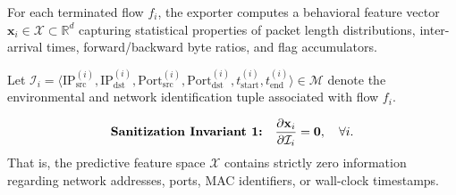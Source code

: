 \documentclass[conference]{IEEEtran}
\begin{document}
For each terminated flow $f_i$, the exporter computes a behavioral feature vector $\mathbf{x}_i \in \mathcal{X} \subset \mathbb{R}^d$ capturing statistical properties of packet length distributions, inter-arrival times, forward/backward byte ratios, and flag accumulators. 

Let $\mathcal{I}_i = \langle \text{IP}_{\text{src}}^{(i)}, \text{IP}_{\text{dst}}^{(i)}, \text{Port}_{\text{src}}^{(i)}, \text{Port}_{\text{dst}}^{(i)}, t_{\text{start}}^{(i)}, t_{\text{end}}^{(i)} \rangle \in \mathcal{M}$ denote the environmental and network identification tuple associated with flow $f_i$. 

\begin{equation}
\text{\textbf{Sanitization Invariant 1:}} \quad \frac{\partial \mathbf{x}_i}{\partial \mathcal{I}_i} = \mathbf{0}, \quad \forall i.
\end{equation}
That is, the predictive feature space $\mathcal{X}$ contains strictly zero information regarding network addresses, ports, MAC identifiers, or wall-clock timestamps.
\end{document}
